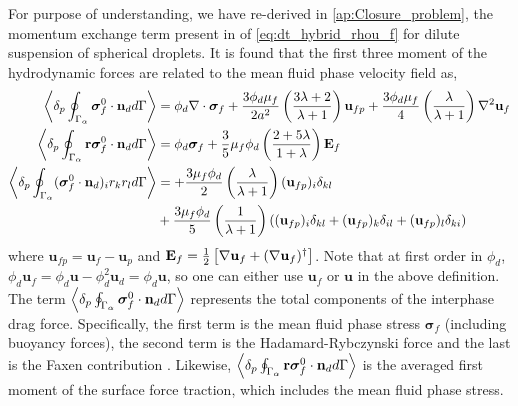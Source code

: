 For purpose of understanding, we have re-derived in \ref{ap:Closure_problem}, the momentum exchange term present in of \ref{eq:dt_hybrid_rhou_f} for dilute suspension of spherical droplets. 
It is found that the first three moment of the hydrodynamic forces are related to the mean fluid phase velocity field as, 
\begin{align}
    \label{eq:zeroth_mom}
    \pSavg{\bm{\sigma}_f^0\cdot \textbf{n}_d} &= 
    \phi_d \div\bm\sigma_f
    + \frac{3\phi_d\mu_f}{2 a^2} 
    \left(\frac{3\lambda+2}{\lambda+1}\right) \textbf{u}_{f p} 
    + \frac{3\phi_d\mu_f}{4} \left(\frac{\lambda}{\lambda+1}\right)\grad^2\textbf{u}_f\\
    \label{eq:first_mom}
    \pavg{\intS{\textbf{r}\bm{\sigma}_f^0 \cdot \textbf{n}_d}} 
    &= 
    \phi_d \bm\sigma_f + 
    \frac{3}{5}\mu_f \phi_d \left(\frac{2+5\lambda}{1+\lambda}\right)
    \textbf{E}_f
    \\
    \label{eq:second_mom}
        \pavg{\intS{(\bm{\sigma}_f^0 \cdot \textbf{n}_d)_ir_kr_l}} &=
        + \frac{3\mu_f\phi_d}{2}\left(\frac{\lambda}{\lambda+1}\right)(\textbf{u}_{fp})_i\delta_{kl}\\
        &+ \frac{3\mu_f\phi_d}{5}\left(\frac{1}{\lambda+1}\right)((\textbf{u}_{fp})_i\delta_{kl}+ (\textbf{u}_{fp})_k\delta_{il}+(\textbf{u}_{fp})_l\delta_{ki})\nonumber
\end{align}
where $\textbf{u}_{fp} = \textbf{u}_f - \textbf{u}_p$ and $\textbf{E}_f = \frac{1}{2}\left[\mathbf{\nabla} \textbf{u}_f + (\mathbf{\nabla} \textbf{u}_f)^\dagger\right]$. 
Note that at first order in $\phi_d$, $\phi_d\textbf{u}_f =\phi_d\textbf{u} - \phi_d^2 \textbf{u}_d = \phi_d\textbf{u}$, so one can either use $\textbf{u}_f$ or $\textbf{u}$ in the above definition. 
The term $\left<\delta_{p} \oint_{\Gamma_{\alpha}} \bm{\sigma}_f^0 \cdot \textbf{n}_d d\Gamma\right>$ represents the total components of the interphase drag force.
Specifically, the first term is the mean fluid phase stress $\bm\sigma_f$ (including buoyancy forces), the second term is the Hadamard-Rybczynski force and the last is the Faxen contribution \citep{kim2013microhydrodynamics}. 
Likewise, $\left<\delta_{p} \oint_{\Gamma_{\alpha}} \textbf{r}\bm{\sigma}_f^0 \cdot \textbf{n}_d d\Gamma\right>$ is the averaged first moment of the surface force traction, which includes the mean fluid phase stress. 
